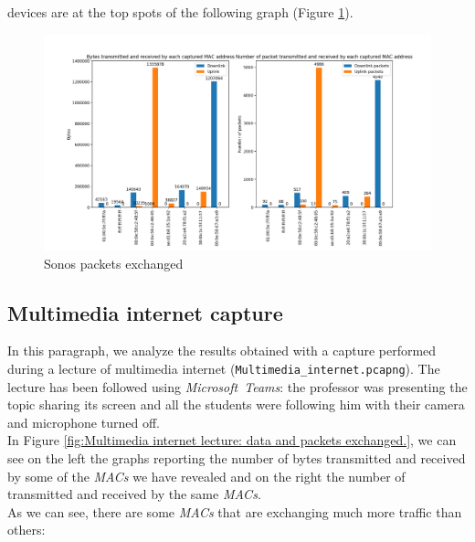 devices are at the top spots of the following graph (Figure \ref{fig:Sonos_packets}).
\begin{figure}[h]
    \includegraphics[width=\textwidth]{Graphs/SONOS_bytes_packets.png}
    \caption{Sonos packets exchanged}
    \label{fig:Sonos_packets}
\end{figure}


\subsection{Multimedia internet capture}
In this paragraph, we analyze the results obtained with a capture performed during a lecture of
multimedia internet (\texttt{Multimedia\_internet.pcapng}).
The lecture has been followed using \textit{Microsoft\ Teams}: the professor was presenting the
topic sharing its screen and all the students were following him with their camera and microphone turned off.\\
In Figure \ref{fig:Multimedia internet lecture: data and packets exchanged.}, we can see on the
left the graphs reporting the number of bytes transmitted and received by some of the \textit{MACs}
we have revealed and on the right the number of transmitted and received by the same \textit{MACs}.\\
As we can see, there are some \textit{MACs} that are exchanging much more traffic than others:

